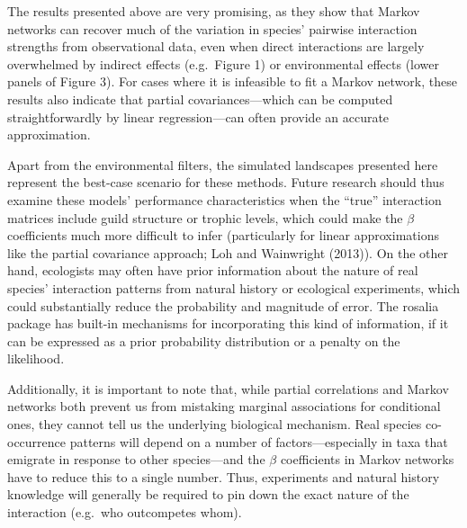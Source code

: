 \documentclass[12pt,]{article}
\begin{document}
\begin{spacing}{1.9}
\begin{flushleft}
The results presented above are very promising, as they show that Markov
networks can recover much of the variation in species' pairwise
interaction strengths from observational data, even when direct
interactions are largely overwhelmed by indirect effects (e.g.~Figure 1)
or environmental effects (lower panels of Figure 3). For cases where it
is infeasible to fit a Markov network, these results also indicate that
partial covariances---which can be computed straightforwardly by linear
regression---can often provide an accurate approximation.

Apart from the environmental filters, the simulated landscapes presented
here represent the best-case scenario for these methods. Future research
should thus examine these models' performance characteristics when the
``true'' interaction matrices include guild structure or trophic levels,
which could make the \(\beta\) coefficients much more difficult to infer
(particularly for linear approximations like the partial covariance
approach; Loh and Wainwright (2013)). On the other hand, ecologists may
often have prior information about the nature of real species'
interaction patterns from natural history or ecological experiments,
which could substantially reduce the probability and magnitude of error.
The rosalia package has built-in mechanisms for incorporating this kind
of information, if it can be expressed as a prior probability
distribution or a penalty on the likelihood.

Additionally, it is important to note that, while partial correlations
and Markov networks both prevent us from mistaking marginal associations
for conditional ones, they cannot tell us the underlying biological
mechanism. Real species co-occurrence patterns will depend on a number
of factors---especially in taxa that emigrate in response to other
species---and the \(\beta\) coefficients in Markov networks have to
reduce this to a single number. Thus, experiments and natural history
knowledge will generally be required to pin down the exact nature of the
interaction (e.g.~who outcompetes whom).


\end{flushleft}
\end{spacing}
\end{document}
